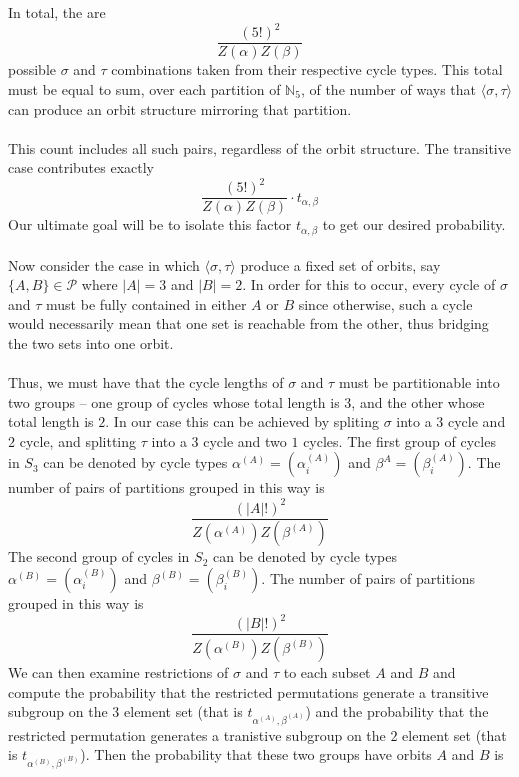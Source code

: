 	\\\\In total, the are
	\[
		\frac{(5!)^2}{Z(\alpha)Z(\beta)}
	\]
	possible $\sigma$ and $\tau$ combinations taken from their respective cycle types. This total must be equal to sum, over each partition of $\mathbb{N}_5$, of the number of ways that  $\langle \sigma, \tau \rangle$ can produce an orbit structure mirroring that partition.
	\\\\This count includes all such pairs, regardless of the orbit structure. The transitive case contributes exactly
	\[
		\frac{(5!)^2}{Z(\alpha)Z(\beta)}\cdot t_{\alpha, \beta}
	\]
    Our ultimate goal will be to isolate this factor $t_{\alpha, \beta}$ to get our desired probability. 
	\\\\Now consider the case in which $\langle \sigma, \tau \rangle$ produce a fixed set of orbits, say $\{A,B\}\in\mathcal{P}$ where $|A| = 3$ and $|B| = 2$. In order for this to occur, every cycle of $\sigma$ and $\tau$ must be fully contained in either $A$ or $B$ since otherwise, such a cycle would necessarily mean that one set is reachable from the other, thus bridging the two sets into one orbit.
	\\\\Thus, we must have that the cycle lengths of $\sigma$ and $\tau$ must be partitionable into two groups -- one group of cycles whose total length is $3$, and the other whose total length is $2$. In our case this can be achieved by spliting $\sigma$ into a $3$ cycle and $2$ cycle, and splitting $\tau$ into a $3$ cycle and two $1$ cycles. The first group of cycles in $S_3$ can be denoted by cycle types $\alpha^{(A)} = (\alpha^{(A)}_{i})$ and $\beta^{A} = (\beta^{(A)}_{i})$. The number of pairs of partitions grouped in this way is
	\[
		\frac{(|A|!)^2}{Z(\alpha^{(A)})Z(\beta^{(A)})}
	\]
	The second group of cycles in $S_2$ can be denoted by cycle types $\alpha^{(B)} = (\alpha^{(B)}_i)$ and $\beta^{(B)} = (\beta_{i}^{(B)})$. The number of pairs of partitions grouped in this way is
	\[
		\frac{(|B|!)^2}{Z(\alpha^{(B)})Z(\beta^{(B)})}
	\]
	We can then examine restrictions of $\sigma$ and $\tau$ to each subset $A$ and $B$ and compute the probability that the restricted permutations generate a transitive subgroup on the $3$ element set (that is $t_{\alpha^{(A)},\beta^{(A)}}$) and the probability that the restricted permutation generates a tranistive subgroup on the $2$ element set (that is $t_{\alpha^{(B)},\beta^{(B)}}$). Then the probability that these two groups have orbits $A$ and $B$ is
